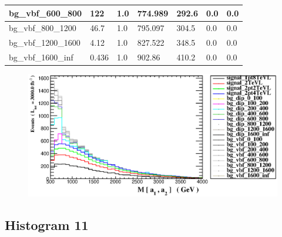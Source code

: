 \documentclass[a4paper, 10pt]{article}
\begin{document}
\begin{table}[H]
\begin{center}
\begin{tabular}{|m{23.0mm}|m{23.0mm}|m{18.0mm}|m{19.0mm}|m{19.0mm}|m{19.0mm}|m{19.0mm}|}
      \hline
      {\cellcolor{white}         bg\_vbf\_600\_800}& {\cellcolor{white}         122}& {\cellcolor{white}         1.0}& {\cellcolor{white}         774.989}& {\cellcolor{white}         292.6}& {\cellcolor{green}         0.0}& {\cellcolor{green}         0.0}\\
      \hline
      {\cellcolor{white}         bg\_vbf\_800\_1200}& {\cellcolor{white}         46.7}& {\cellcolor{white}         1.0}& {\cellcolor{white}         795.097}& {\cellcolor{white}         304.5}& {\cellcolor{green}         0.0}& {\cellcolor{green}         0.0}\\
      \hline
      {\cellcolor{white}         bg\_vbf\_1200\_1600}& {\cellcolor{white}         4.12}& {\cellcolor{white}         1.0}& {\cellcolor{white}         827.522}& {\cellcolor{white}         348.5}& {\cellcolor{green}         0.0}& {\cellcolor{green}         0.0}\\
      \hline
      {\cellcolor{white}         bg\_vbf\_1600\_inf}& {\cellcolor{white}         0.436}& {\cellcolor{white}         1.0}& {\cellcolor{white}         902.86}& {\cellcolor{white}         410.2}& {\cellcolor{green}         0.0}& {\cellcolor{green}         0.0}\\
\hline
    \end{tabular}
  \end{center}
\end{table}

\begin{figure}[H]
  \begin{center}
    \includegraphics[scale=0.45]{selection_9.eps}\\
\caption{   }
  \end{center}
\end{figure}
      \newpage
\subsection{ Histogram 11}
\end{document}
